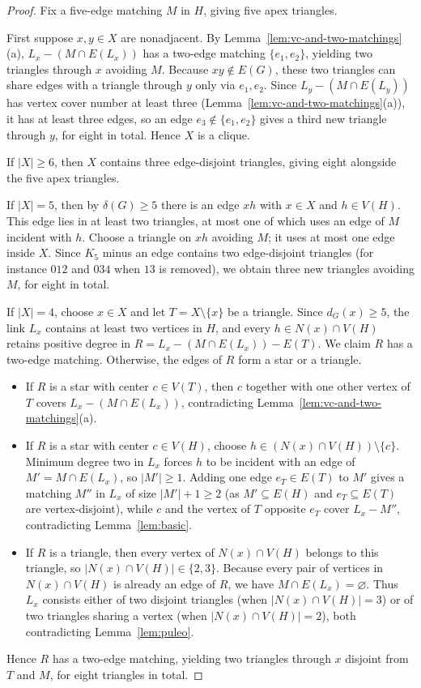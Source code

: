 \documentclass[11pt]{article}
\begin{document}
\begin{proof}
Fix a five-edge matching $M$ in $H$, giving five apex triangles.

First suppose $x,y\in X$ are nonadjacent. By Lemma~\ref{lem:vc-and-two-matchings}(a), $L_x-(M\cap E(L_x))$ has a two-edge matching $\{e_1,e_2\}$, yielding two triangles through $x$ avoiding $M$. Because $xy\notin E(G)$, these two triangles can share edges with a triangle through $y$ only via $e_1,e_2$. Since $L_y-(M\cap E(L_y))$ has vertex cover number at least three (Lemma~\ref{lem:vc-and-two-matchings}(a)), it has at least three edges, so an edge $e_3\notin\{e_1,e_2\}$ gives a third new triangle through $y$, for eight in total. Hence $X$ is a clique.

If $|X|\geq 6$, then $X$ contains three edge-disjoint triangles, giving eight alongside the five apex triangles.

If $|X|=5$, then by $\delta(G)\geq 5$ there is an edge $xh$ with $x\in X$ and $h\in V(H)$. This edge lies in at least two triangles, at most one of which uses an edge of $M$ incident with $h$. Choose a triangle on $xh$ avoiding $M$; it uses at most one edge inside $X$. Since $K_5$ minus an edge contains two edge-disjoint triangles (for instance $012$ and $034$ when $13$ is removed), we obtain three new triangles avoiding $M$, for eight in total.

If $|X|=4$, choose $x\in X$ and let $T=X\setminus\{x\}$ be a triangle. Since $d_G(x)\geq 5$, the link $L_x$ contains at least two vertices in $H$, and every $h\in N(x)\cap V(H)$ retains positive degree in $R=L_x-(M\cap E(L_x))-E(T)$. We claim $R$ has a two-edge matching. Otherwise, the edges of $R$ form a star or a triangle.
\begin{itemize}
\item If $R$ is a star with center $c\in V(T)$, then $c$ together with one other vertex of $T$ covers $L_x-(M\cap E(L_x))$, contradicting Lemma~\ref{lem:vc-and-two-matchings}(a).
\item If $R$ is a star with center $c\in V(H)$, choose $h\in (N(x)\cap V(H))\setminus\{c\}$. Minimum degree two in $L_x$ forces $h$ to be incident with an edge of $M'=M\cap E(L_x)$, so $|M'|\geq 1$. Adding one edge $e_T\in E(T)$ to $M'$ gives a matching $M''$ in $L_x$ of size $|M'|+1\geq 2$ (as $M'\subseteq E(H)$ and $e_T\subseteq E(T)$ are vertex-disjoint), while $c$ and the vertex of $T$ opposite $e_T$ cover $L_x-M''$, contradicting Lemma~\ref{lem:basic}.
\item If $R$ is a triangle, then every vertex of $N(x)\cap V(H)$ belongs to this triangle, so $|N(x)\cap V(H)|\in\{2,3\}$. Because every pair of vertices in $N(x)\cap V(H)$ is already an edge of $R$, we have $M\cap E(L_x)=\varnothing$. Thus $L_x$ consists either of two disjoint triangles (when $|N(x)\cap V(H)|=3$) or of two triangles sharing a vertex (when $|N(x)\cap V(H)|=2$), both contradicting Lemma~\ref{lem:puleo}.
\end{itemize}
Hence $R$ has a two-edge matching, yielding two triangles through $x$ disjoint from $T$ and $M$, for eight triangles in total.


\end{proof}
\end{document}

